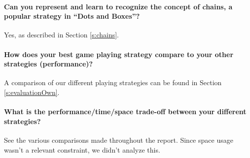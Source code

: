 \paragraph{Can you represent and learn to recognize the concept of chains, a popular strategy in ``Dots and Boxes''?} Yes, as described in Section \ref{s:chains}.
	
\paragraph{How does your best game playing strategy compare to your other strategies (performance)?} A comparison of our different playing strategies can be found in Section \ref{s:evaluationOwn}.
	
\paragraph{What is the performance/time/space trade-off between your different strategies?} See the various comparisons made throughout the report. Since space usage wasn't a relevant constraint, we didn't analyze this.
